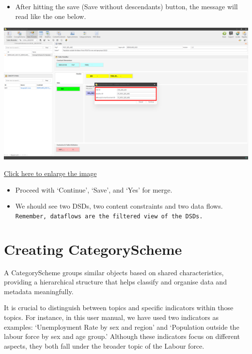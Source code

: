 \documentclass[
]{book}
\providecommand{\tightlist}{%
  \setlength{\itemsep}{0pt}\setlength{\parskip}{0pt}}
\begin{document}
\begin{itemize}
\tightlist
\item
  After hitting the save (Save without descendants) button, the message will read like the one below.
\end{itemize}

\begin{center}\includegraphics[width=1\linewidth]{./images/image158} \end{center}

\href{images/image158.png}{Click here to enlarge the image}

\begin{itemize}
\item
  Proceed with `Continue', `Save', and `Yes' for merge.
\item
  We should see two DSDs, two content constraints and two data flows. \texttt{Remember,\ dataflows\ are\ the\ filtered\ view\ of\ the\ DSDs.}
\end{itemize}

\hypertarget{creating-category}{%
\section{Creating CategoryScheme}\label{creating-category}}

A CategoryScheme groups similar objects based on shared characteristics, providing a hierarchical structure that helps classify and organise data and metadata meaningfully.

It is crucial to distinguish between topics and specific indicators within those topics. For instance, in this user manual, we have used two indicators as examples: `Unemployment Rate by sex and region' and `Population outside the labour force by sex and age group.' Although these indicators focus on different aspects, they both fall under the broader topic of the Labour force.
\end{document}
